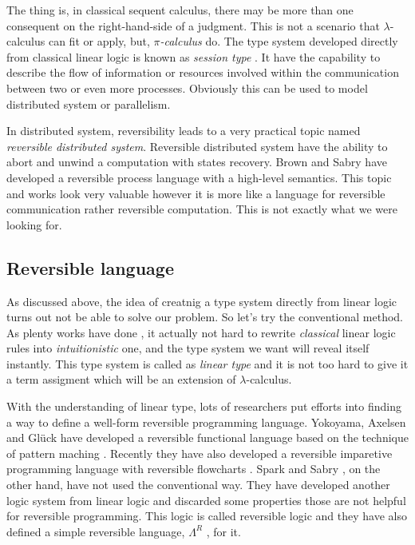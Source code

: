 \documentclass[a4paper,twocolumn]{article}
\begin{document}
\begin{prooftree}
\end{prooftree}

The thing is, in classical sequent calculus, there may be more than one consequent on the right-hand-side of a judgment. This is not a scenario that $\lambda$-calculus can fit or apply, but, \textit{$\pi$-calculus} do. The type system developed directly from classical linear logic is known as \textit{session type} \cite{Wadler12}. It have the capability to describe the flow of information or resources involved within the communication between two or even more processes. Obviously this can be used to model distributed system or parallelism.

In distributed system, reversibility leads to a very practical topic named {\textit{reversible distributed system}}. Reversible distributed system have the ability to abort and unwind a computation with states recovery. Brown and Sabry \cite{Brown16} have developed a reversible process language with a high-level semantics. This topic and works look very valuable however it is more like a language for reversible communication rather reversible computation. This is not exactly what we were looking for.

\subsection*{Reversible language}

As discussed above, the idea of creatnig a type system directly from linear logic turns out not be able to solve our problem. So let's try the conventional method. As plenty works have done \cite{Benton92, Wadler93, Benton93, Ronchi94, Turner98}, it actually not hard to rewrite \textit{classical} linear logic rules into \textit{intuitionistic} one, and the type system we want will reveal itself instantly. This type system is called as \textit{linear type} and it is not too hard to give it a term assigment which will be an extension of $\lambda$-calculus.

With the understanding of linear type, lots of researchers put efforts into finding a way to define a well-form reversible programming language. Yokoyama, Axelsen and Gl\"{u}ck have developed a reversible functional language based on the technique of pattern maching \cite{Yokoyama11}. Recently they have also developed a reversible imparetive programming language with reversible flowcharts \cite{Yokoyama16}. Spark and Sabry \cite{Sparks14}, on the other hand, have not used the conventional way. They have developed another logic system from linear logic and discarded some properties those are not helpful for reversible programming. This logic is called reversible logic and they have also defined a simple reversible language, $\Lambda^{R}$ , for it.
\end{document}
